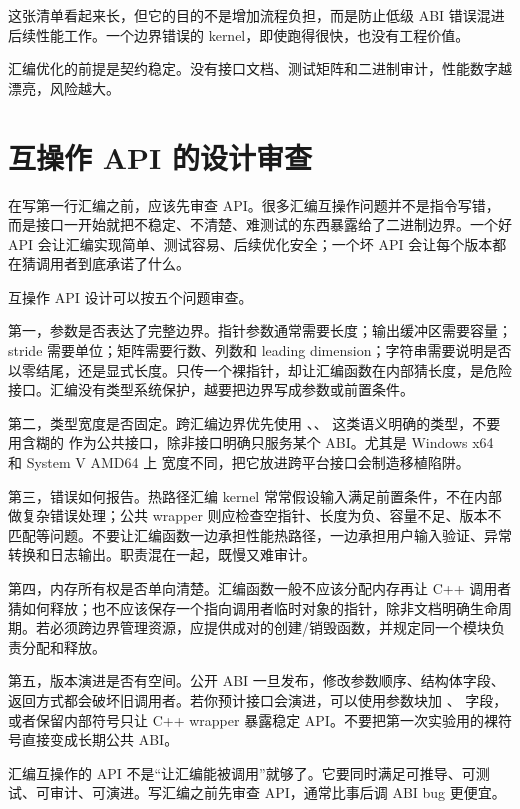 这张清单看起来长，但它的目的不是增加流程负担，而是防止低级 ABI 错误混进后续性能工作。一个边界错误的 kernel，即使跑得很快，也没有工程价值。

\begin{keyidea}
汇编优化的前提是契约稳定。没有接口文档、测试矩阵和二进制审计，性能数字越漂亮，风险越大。
\end{keyidea}

\section{互操作 API 的设计审查}

在写第一行汇编之前，应该先审查 API。很多汇编互操作问题并不是指令写错，而是接口一开始就把不稳定、不清楚、难测试的东西暴露给了二进制边界。一个好 API 会让汇编实现简单、测试容易、后续优化安全；一个坏 API 会让每个版本都在猜调用者到底承诺了什么。

互操作 API 设计可以按五个问题审查。

第一，参数是否表达了完整边界。指针参数通常需要长度；输出缓冲区需要容量；stride 需要单位；矩阵需要行数、列数和 leading dimension；字符串需要说明是否以零结尾，还是显式长度。只传一个裸指针，却让汇编函数在内部猜长度，是危险接口。汇编没有类型系统保护，越要把边界写成参数或前置条件。

第二，类型宽度是否固定。跨汇编边界优先使用 、、 这类语义明确的类型，不要用含糊的  作为公共接口，除非接口明确只服务某个 ABI。尤其是 Windows x64 和 System V AMD64 上  宽度不同，把它放进跨平台接口会制造移植陷阱。

第三，错误如何报告。热路径汇编 kernel 常常假设输入满足前置条件，不在内部做复杂错误处理；公共 wrapper 则应检查空指针、长度为负、容量不足、版本不匹配等问题。不要让汇编函数一边承担性能热路径，一边承担用户输入验证、异常转换和日志输出。职责混在一起，既慢又难审计。

第四，内存所有权是否单向清楚。汇编函数一般不应该分配内存再让 C++ 调用者猜如何释放；也不应该保存一个指向调用者临时对象的指针，除非文档明确生命周期。若必须跨边界管理资源，应提供成对的创建/销毁函数，并规定同一个模块负责分配和释放。

第五，版本演进是否有空间。公开 ABI 一旦发布，修改参数顺序、结构体字段、返回方式都会破坏旧调用者。若你预计接口会演进，可以使用参数块加 、 字段，或者保留内部符号只让 C++ wrapper 暴露稳定 API。不要把第一次实验用的裸符号直接变成长期公共 ABI。

\begin{mentalmodel}
汇编互操作的 API 不是“让汇编能被调用”就够了。它要同时满足可推导、可测试、可审计、可演进。写汇编之前先审查 API，通常比事后调 ABI bug 更便宜。
\end{mentalmodel}

